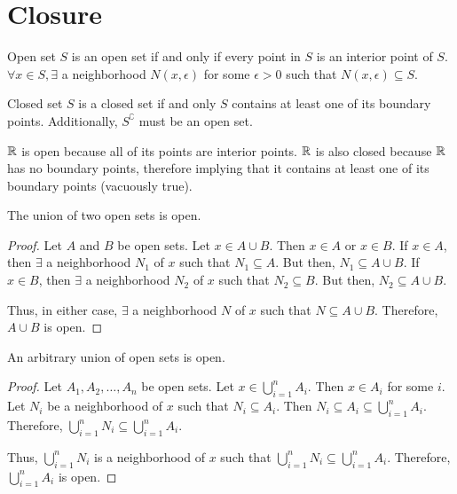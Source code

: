 \section{Closure}
\begin{definition}{Open set}{}
    $S$ is an open set if and only if every point in $S$ is an interior point of $S$. $\forall x \in S, \exists$ a neighborhood $N(x, \epsilon)$ for some $\epsilon > 0$ such that $N(x, \epsilon) \subseteq S$.
\end{definition}

\begin{definition}{Closed set}{}
    $S$ is a closed set if and only $S$ contains at least one of its boundary points. Additionally, $S^\complement$ must be an open set.
\end{definition}

\begin{note}
    $\mathbb{R}$ is open because all of its points are interior points. $\mathbb{R}$ is also closed because $\mathbb{R}$ has no boundary points, therefore implying that it contains at least one of its boundary points (vacuously true).
\end{note}

\begin{theorem}{}{}
    The union of two open sets is open.
\end{theorem}
\begin{proof}
    Let $A$ and $B$ be open sets. Let $x \in A \cup B$. Then $x \in A$ or $x \in B$. If $x \in A$, then $\exists$ a neighborhood $N_1$ of $x$ such that $N_1 \subseteq A$. But then, $N_1 \subseteq A \cup B$. If $x \in B$, then $\exists$ a neighborhood $N_2$ of $x$ such that $N_2 \subseteq B$. But then, $N_2 \subseteq A \cup B$. 
    
    Thus, in either case, $\exists$ a neighborhood $N$ of $x$ such that $N \subseteq A \cup B$. Therefore, $A \cup B$ is open.
\end{proof}

\begin{theorem}{}{}
    An arbitrary union of open sets is open.
\end{theorem}
\begin{proof}
    Let $A_1, A_2, \ldots, A_n$ be open sets. Let $x \in \bigcup_{i=1}^n A_i$. Then $x \in A_i$ for some $i$. Let $N_i$ be a neighborhood of $x$ such that $N_i \subseteq A_i$. Then $N_i \subseteq A_i \subseteq \bigcup_{i=1}^n A_i$. Therefore, $\bigcup_{i=1}^n N_i \subseteq \bigcup_{i=1}^n A_i$. 
    
    Thus, $\bigcup_{i=1}^n N_i$ is a neighborhood of $x$ such that $\bigcup_{i=1}^n N_i \subseteq \bigcup_{i=1}^n A_i$. Therefore, $\bigcup_{i=1}^n A_i$ is open.
\end{proof}

